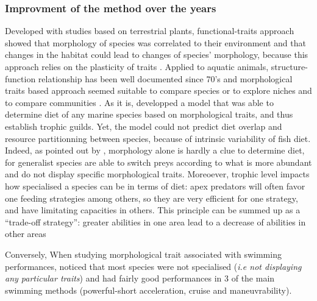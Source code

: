 \subsubsection{Improvment of the method over the years}
Developed with studies based on terrestrial plants, functional-traits approach showed that morphology of species was correlated to their environment and that changes in the habitat could lead to changes of species’ morphology, because this approach relies on the plasticity of traits \citep{lavorel1997,martini2020}. Applied to aquatic animals, structure-function relationship has been well documented since 70’s \citep{gosline1971, lagler1977, webb1984} and morphological traits based approach seemed suitable to compare species \citep{norton1995} or to explore niches and to compare communities \citep{winemiller1991}. As it is, \citep{albouy2011} developped a model that was able to determine diet of any marine species based on morphological traits, and thus establish trophic guilds. Yet, the model could not predict diet overlap and resource partitionning between species, because of intrinsic variability of fish diet. Indeed, as pointed out by \citep{sibbing2000}, morphology alone is hardly a clue to determine diet, for generalist species are able to switch preys according to what is more abundant and do not display specific morphological traits. Moreoever, trophic level impacts how specialised a species can be in terms of diet: apex predators will often favor one feeding strategies among others, so they are very efficient for one strategy, and have limitating capacities in others. This principle can be summed up as a ``trade-off strategy'': greater abilities in one area lead to a decrease of abilities in other areas \citep{norton1995}

Conversely, When studying morphological trait associated with swimming performances, \citep{webb1984} noticed that most species were not specialised (\textit{i.e not displaying any particular traits}) and had fairly good performances in 3 of the main swimming methods (powerful-short acceleration, cruise and maneuvrability). 

